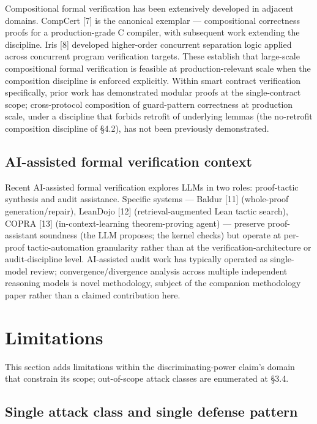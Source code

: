 Compositional formal verification has been extensively developed in
adjacent domains. CompCert {[}7{]} is the canonical exemplar ---
compositional correctness proofs for a production-grade C compiler, with
subsequent work extending the discipline. Iris {[}8{]} developed
higher-order concurrent separation logic applied across concurrent
program verification targets. These establish that large-scale
compositional formal verification is feasible at production-relevant
scale when the composition discipline is enforced explicitly. Within
smart contract verification specifically, prior work has demonstrated
modular proofs at the single-contract scope; cross-protocol composition
of guard-pattern correctness at production scale, under a discipline
that forbids retrofit of underlying lemmas (the no-retrofit composition
discipline of §4.2), has not been previously demonstrated.

\subsection{AI-assisted formal verification
context}\label{ai-assisted-formal-verification-context}

Recent AI-assisted formal verification explores LLMs in two roles:
proof-tactic synthesis and audit assistance. Specific systems --- Baldur
{[}11{]} (whole-proof generation/repair), LeanDojo {[}12{]}
(retrieval-augmented Lean tactic search), COPRA {[}13{]}
(in-context-learning theorem-proving agent) --- preserve proof-assistant
soundness (the LLM proposes; the kernel checks) but operate at per-proof
tactic-automation granularity rather than at the
verification-architecture or audit-discipline level. AI-assisted audit
work has typically operated as single-model review;
convergence/divergence analysis across multiple independent reasoning
models is novel methodology, subject of the companion methodology paper
rather than a claimed contribution here.

\section{Limitations}\label{limitations}

This section adds limitations within the discriminating-power claim's
domain that constrain its scope; out-of-scope attack classes are
enumerated at §3.4.

\subsection{Single attack class and single defense
pattern}\label{single-attack-class-and-single-defense-pattern}

